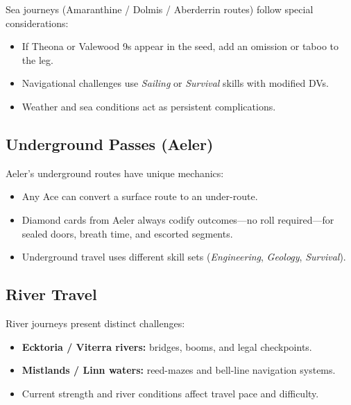 Sea journeys (Amaranthine / Dolmis / Aberderrin routes) follow special considerations:

\begin{itemize}
    \item If Theona or Valewood 9s appear in the seed, add an omission or taboo to the leg.
    \item Navigational challenges use \emph{Sailing} or \emph{Survival} skills with modified DVs.
    \item Weather and sea conditions act as persistent complications.
\end{itemize}

\subsection{Underground Passes (Aeler)}\label{subsec:underways}

Aeler's underground routes have unique mechanics:

\begin{itemize}
    \item Any Ace can convert a surface route to an under-route.
    \item Diamond cards from Aeler always codify outcomes---no roll required---for sealed doors, breath time, and escorted segments.
    \item Underground travel uses different skill sets (\emph{Engineering}, \emph{Geology}, \emph{Survival}).
\end{itemize}

\subsection{River Travel}\label{subsec:river_travel}

River journeys present distinct challenges:

\begin{itemize}
    \item \textbf{Ecktoria / Viterra rivers:} bridges, booms, and legal checkpoints.
    \item \textbf{Mistlands / Linn waters:} reed-mazes and bell-line navigation systems.
    \item Current strength and river conditions affect travel pace and difficulty.
\end{itemize}

